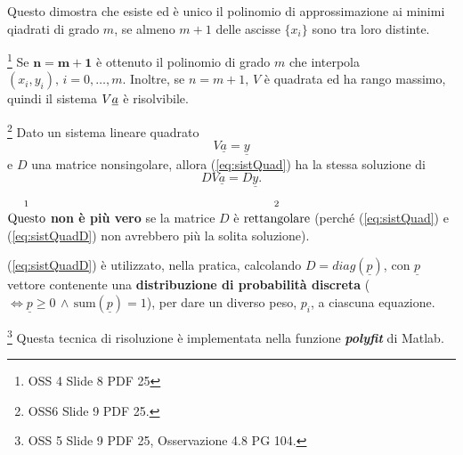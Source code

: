 Questo dimostra che esiste ed è unico il polinomio di approssimazione ai minimi qiadrati di grado $m$, se almeno $m+1$ delle ascisse $\{x_i\}$ sono tra loro distinte.

\begin{remark}
    \footnote{OSS 4 Slide 8 PDF 25}
    Se $\boldsymbol{n=m+1}$ è ottenuto il polinomio di grado $m$ che interpola $(x_i,y_i),\, i=0,\hdots,m$. Inoltre, se $n=m+1,\, V$ è quadrata ed ha rango massimo, quindi il sistema $V\uline a$ è risolvibile.
\end{remark}

\begin{remark}
	\footnote{OSS6 Slide 9 PDF 25.} Dato un sistema lineare quadrato
	\begin{equation}\label{eq:sistQuad}
		V\underline{a}=\underline{y}
	\end{equation}
	e $D$ una matrice nonsingolare, allora (\ref{eq:sistQuad}) ha la stessa soluzione di
	\begin{equation}\label{eq:sistQuadD}
		DV\underline{a}=D\underline{y}.
	\end{equation}
\end{remark}

$\overset{\footnotemark}{\text{Questo}}$ \textbf{non è più vero} se la matrice $D$ è $\overset{\footnotemark}{\text{rettangolare}}$ (perché (\ref{eq:sistQuad}) e (\ref{eq:sistQuadD}) non avrebbero più la solita soluzione). 

(\ref{eq:sistQuadD}) è utilizzato, nella pratica, calcolando $D=diag(\underline{p})$, con $\underline{p}$ vettore contenente una \textbf{distribuzione di probabilità discreta} ($\iff \underline{p}\geq 0 \,\land\, \text{sum}(\underline{p})=1$), per dare un diverso peso, $p_i$, a ciascuna equazione.

\addtocounter{footnote}{-1}


\begin{remark}
    \footnote{OSS 5 Slide 9 PDF 25, Osservazione 4.8 PG 104.} Questa tecnica di risoluzione è implementata nella funzione \textit{\textbf{polyfit}} di Matlab.
\end{remark}

